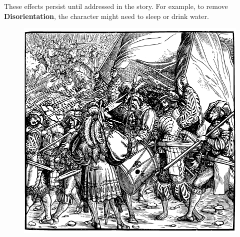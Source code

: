 \documentclass[12pt]{book}  %
\begin{document}
These effects persist until addressed in the story. For example, to remove \textbf{Disorientation}, the character might need to sleep or drink water.

\begin{figure}[h]
    \centering
    \includegraphics[width=\textwidth]{./images/survival02.pdf}
\end{figure}
\end{document}
